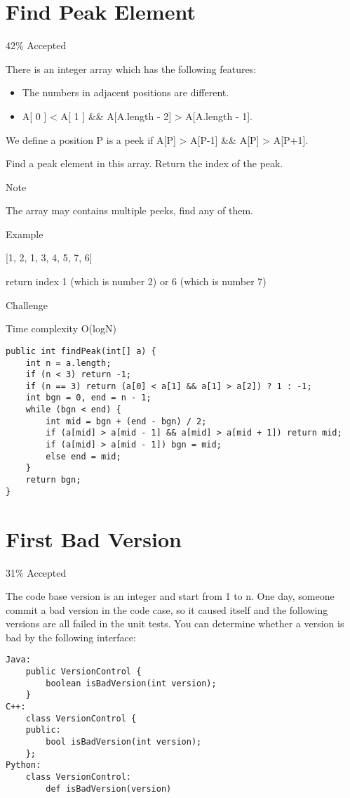 \documentclass[12pt]{book}
\begin{document}
\chapter{Find Peak Element}
\label{sec-28}

42\% Accepted

There is an integer array which has the following features:

\begin{itemize}
\item The numbers in adjacent positions are different.

\item A[ 0 ] < A[ 1 ] \&\& A[A.length - 2] > A[A.length - 1].
\end{itemize}

We define a position P is a peek if A[P] > A[P-1] \&\& A[P] > A[P+1].

Find a peak element in this array. Return the index of the peak.

Note

The array may contains multiple peeks, find any of them.

Example

[1, 2, 1, 3, 4, 5, 7, 6]

return index 1 (which is number 2)  or 6 (which is number 7)

Challenge

Time complexity O(logN)
\lstset{language=java,label= ,caption= ,numbers=none}
\begin{lstlisting}
public int findPeak(int[] a) {
    int n = a.length;
    if (n < 3) return -1;
    if (n == 3) return (a[0] < a[1] && a[1] > a[2]) ? 1 : -1;
    int bgn = 0, end = n - 1;
    while (bgn < end) {
        int mid = bgn + (end - bgn) / 2;
        if (a[mid] > a[mid - 1] && a[mid] > a[mid + 1]) return mid;
        if (a[mid] > a[mid - 1]) bgn = mid;
        else end = mid;
    }
    return bgn;
}
\end{lstlisting}
\chapter{First Bad Version}
\label{sec-29}

31\% Accepted

The code base version is an integer and start from 1 to n. One day, someone commit a bad version in the code case, so it caused itself and the following versions are all failed in the unit tests.
You can determine whether a version is bad by the following interface: 
\lstset{language=java,label= ,caption= ,numbers=none}
\begin{lstlisting}
Java:
    public VersionControl {
        boolean isBadVersion(int version);
    }
C++:
    class VersionControl {
    public:
        bool isBadVersion(int version);
    };
Python:
    class VersionControl:
        def isBadVersion(version)
\end{lstlisting}
\end{document}
